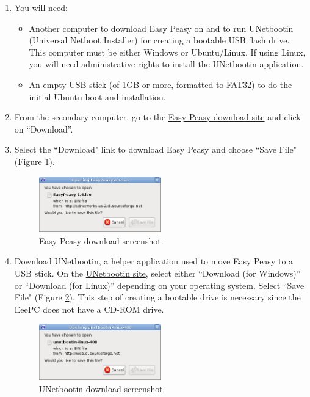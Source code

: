 \begin{enumerate}

\item You will need:
\begin{itemize}
\item Another computer to download Easy Peasy on and to run UNetbootin (Universal Netboot Installer) for creating a bootable USB flash drive. This computer must be either Windows or Ubuntu/Linux. If using Linux, you will need administrative rights to install the UNetbootin application.
\item An empty USB stick (of 1GB or more, formatted to FAT32) to do the initial Ubuntu boot and installation. 

\end{itemize}

\item From the secondary computer, go to the \href{http://www.geteasypeasy.com/}{Easy Peasy download site} and click on ``Download''.

\item Select the ``Download" link to download Easy Peasy and choose ``Save File" (Figure \ref{fig:easy_peasy}).
\begin{figure}[!h]
\centering
\includegraphics[width=0.5\textwidth]{figures/2_download_easypeasy2.png}
\caption{Easy Peasy download screenshot.}
\label{fig:easy_peasy}
\end{figure}


\item Download UNetbootin, a helper application used to move Easy Peasy to a USB stick. On the \href{http://unetbootin.sourceforge.net/}{UNetbootin site}, select either ``Download (for Windows)'' or ``Download (for Linux)'' depending on your operating system. Select ``Save File" (Figure \ref{fig:unetboot_download}). This step of creating a bootable drive is necessary since the EeePC does not have a CD-ROM drive.

\begin{figure}[!h]
\centering
\includegraphics[width=0.5\textwidth]{figures/2_download_unetbootin.png}
\caption{UNetbootin download screenshot.}
\label{fig:unetboot_download}
\end{figure}


\end{enumerate}
